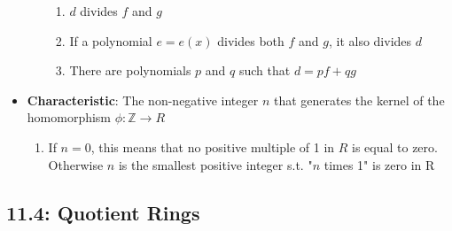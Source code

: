 \documentclass[12pt]{article}
\begin{document}
\begin{itemize}
\begin{enumerate}
\begin{enumerate}
      \item $d$ divides $f$ and $g$
      \item If a polynomial $e = e(x)$ divides both $f$ and $g$, it also divides $d$
      \item There are polynomials $p$ and $q$ such that $d = pf + qg$
    \end{enumerate}
  \end{enumerate}
  \item \textbf{Characteristic}: The non-negative integer $n$ that generates the kernel of the homomorphism $\phi: \mathbb{Z} \to R$
  \begin{enumerate}
    \item If $n = 0$, this means that no positive multiple of 1 in $R$ is equal to zero. Otherwise $n$ is the smallest positive integer s.t. "$n$ times 1" is zero in R
  \end{enumerate}
\end{itemize}

\subsection*{11.4: Quotient Rings}
\begin{itemize}

\end{itemize}

\iffalse
\subsection*{Problem 1.1}
\textbf{Prove that 7 + $\sqrt[3]{2}$ and $\sqrt{3}$ + $\sqrt{-5}$ are algeabraic numbers.}
\begin{proof}
Since p is not in M, it is not between or equal to a and b, and therefore any interval that contains p is not within M.
\end{proof}
\fi
\end{document}
